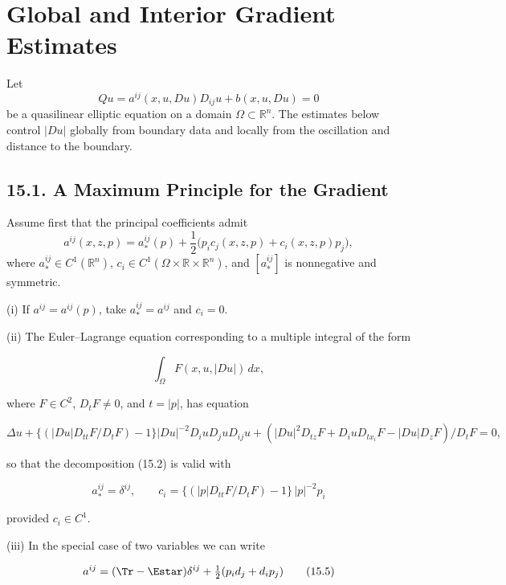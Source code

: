 \chapter{Global and Interior Gradient Estimates}

Let
\begin{equation}\tag{15.1}
Qu=a^{ij}(x,u,Du)D_{ij}u+b(x,u,Du)=0
\end{equation}
be a quasilinear elliptic equation on a domain $\Omega\subset\mathbb R^n$.
The estimates below control $|Du|$ globally from boundary data and locally from
the oscillation and distance to the boundary.

\section*{15.1. A Maximum Principle for the Gradient}

Assume first that the principal coefficients admit
\begin{equation}\tag{15.2}
a^{ij}(x,z,p)=a_*^{ij}(p)
+
\frac12\bigl(p_ic_j(x,z,p)+c_i(x,z,p)p_j\bigr),
\end{equation}
where $a_*^{ij}\in C^1(\mathbb R^n)$,
$c_i\in C^1(\Omega\times\mathbb R\times\mathbb R^n)$, and
$[a_*^{ij}]$ is nonnegative and symmetric.


(i) If \(a^{ij}=a^{ij}(p)\), take \(a_*^{ij}=a^{ij}\) and \(c_i=0\).

(ii) The Euler--Lagrange equation corresponding to a multiple integral of the form

\begin{equation}
\int_{\Omega} F(x,u,|Du|)\,dx,
\tag{15.3}
\end{equation}

where \(F\in C^2\), \(D_tF\ne0\), and \(t=|p|\), has equation

\begin{equation}
\Delta u+\{(|Du|D_{tt}F/D_tF)-1\}|Du|^{-2}D_i u D_j u D_{ij}u
+ (|Du|^2D_{tz}F + D_i u D_{tx_i}F - |Du|D_zF)/D_tF=0,
\tag{15.4}
\end{equation}

so that the decomposition (15.2) is valid with

\[
a_*^{ij}=\delta^{ij},\qquad c_i=\{(|p|D_{tt}F/D_tF)-1\}\,|p|^{-2}p_i
\]

provided \(c_i\in C^1\).

(iii) In the special case of two variables we can write

\begin{equation}
 a^{ij}=(\Tr-\Estar)\delta^{ij}+\tfrac12(p_i d_j+d_i p_j)
\tag{15.5}
\end{equation}

